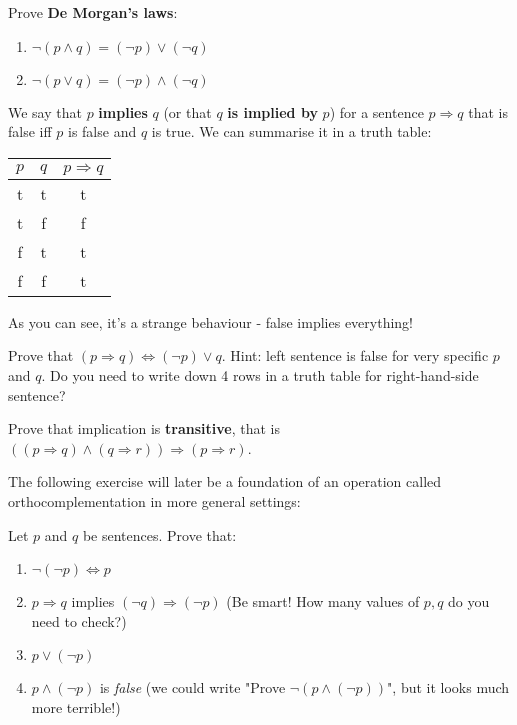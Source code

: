 \begin{exercise}
  Prove \textbf{De Morgan's laws}:
  \begin{enumerate}
    \item $\neg (p\wedge q) = (\neg p)\vee (\neg q)$
    \item $\neg (p\vee q) = (\neg p)\wedge (\neg q)$
  \end{enumerate}
\end{exercise}

\begin{definition}
  We say that $p$ \textbf{implies} $q$ (or that $q$ \textbf{is implied by} $p$) for a sentence $p\Rightarrow q$ that is false iff $p$ is false and $q$ is true.
  We can summarise it in a truth table:
  \begin{center}
    \begin{tabular}{ c  c  c }
      $p$ & $q$ & $p\Rightarrow q$ \\
      \hline
      t  &  t &        t     \\
      t  &  f &        f     \\
      f  &  t &        t     \\
      f  &  f &        t     \\
    \end{tabular}
  \end{center}
  As you can see, it's a strange behaviour - false implies everything!
\end{definition}

\begin{exercise}
  Prove that $(p\Rightarrow q)\Leftrightarrow (\neg p) \vee q$. Hint: left sentence is false for very specific $p$ and $q$. Do you need to write down 4 rows in a truth table for
  right-hand-side sentence?
\end{exercise}

\begin{exercise}
  Prove that implication is \textbf{transitive}, that is $((p\Rightarrow q)\wedge (q\Rightarrow r)) \Rightarrow (p\Rightarrow r)$.
\end{exercise}

The following exercise will later be a foundation of an operation called orthocomplementation in more general settings:
\begin{exercise}
  Let $p$ and $q$ be sentences. Prove that:
  \begin{enumerate}
    \item $\neg(\neg p) \Leftrightarrow p$
    \item $p\Rightarrow q$ implies $(\neg q)\Rightarrow (\neg p)$ (Be smart! How many values of $p, q$ do you need to check?)
    \item $p\vee (\neg p)$
    \item $p\wedge (\neg p)$ is \textit{false} (we could write "Prove $\neg(p\wedge (\neg p))$", but it looks much more terrible!)
  \end{enumerate}
\end{exercise}

